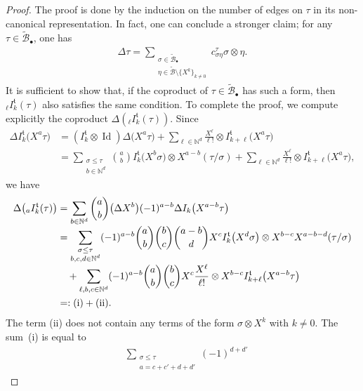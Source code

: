 \documentclass[10pt]{amsart}
\newcommand{\sbullet}{{\scriptscriptstyle\bullet}}
\theoremstyle{plain}
\theoremstyle{definition}
\DeclareMathOperator{\iden}{Id}
\newcommand{\bsmcB}{\boldsymbol{\mathcal{B}}}
\newcommand{\frkt}{\mathfrak{t}}
\newcommand{\bbN}{\mathbb{N}}
\newcommand{\mcB}{\mathcal{B}}
\begin{document}
\begin{proof}
The proof is done by the induction on the number of edges on $\tau$ in its non-canonical representation. In fact, one can conclude a stronger claim; for any $\tau\in\widetilde{\mcB}_\sbullet$, one has\vspace*{-3pt}
\begin{align}\label{eq:stronger than D}
\Delta\tau=\sum_{\substack{\sigma\in\widetilde{\mcB}_\sbullet\\ \eta\in \widetilde{\bsmcB}\setminus\{X^k\}_{k\neq0}}} c_{\sigma\eta}^\tau\sigma\otimes\eta.
\end{align}
It is sufficient to show that, if the coproduct of $\tau\in\widetilde{\mcB}_\sbullet$ has such a form, then ${}_{\ell}I_k^\frkt(\tau)$ also satisfies the same condition. To complete the proof, we compute explicitly the coproduct $\Delta( {}_{\ell}I_k^\frkt(\tau))$.
Since\vspace*{-3pt}
\begin{align*}
\Delta I_k^\frkt\bigl(X^a\tau\bigr)
&=(I_k^\frkt\otimes\iden)\Delta\bigl(X^a\tau\bigr)
+\sum_{\ell\in\bbN^d}\frac{X^{\ell}}{\ell!}\otimes I_{k+\ell}^\frkt\bigl(X^a\tau\bigr)\\
&=\sum_{\substack{\sigma\le\tau\\ b\in\bbN^d}}\binom{a}{b}
I_k^\frkt \bigl(X^b\sigma\bigr)\otimes X^{a-b}(\tau/\sigma)
+\sum_{\ell\in\bbN^d}\frac{X^{\ell}}{\ell!}\otimes I_{k+\ell}^\frkt\bigl(X^a\tau\bigr),
\end{align*}
we have\vspace*{-3pt}
\begin{align*}
\Delta\bigl({}_{a} I_k^\frkt(\tau)\bigr)
&=\sum_{b\in\bbN^d}\binom{a}{b}
\bigl(\Delta X^b\bigr)(-1)^{a-b}\Delta I_k\bigl(X^{a-b}\tau\bigr)\\[-3pt]
&=\sum_{\substack{\sigma\le\tau\\ b,c,d\in\bbN^d}}(-1)^{a-b}
\binom{a}{b}\binom{b}{c}\binom{a-b}{d}
X^c I_k^\frkt\bigl(X^d\sigma\bigr)
\otimes
X^{b-c} X^{a-b-d}(\tau/\sigma)\\[-3pt]
&\quad+\sum_{\ell,b,c\in\bbN^d}(-1)^{a-b}\binom{a}{b}\binom{b}{c}
X^c\frac{X^\ell}{\ell!}
\otimes
X^{b-c}I_{k+\ell}^\frkt\bigl(X^{a-b}\tau\bigr)\\
&=:(\textup{i})+(\textup{ii}).
\end{align*}
The term (ii) does not contain any terms of the form $\sigma\otimes X^k$ with $k\neq0$. The sum~(i) is equal to\vspace*{-3pt}
\begin{align*}
&\sum_{\substack{\sigma\le\tau \\ a=c+c'+d+d'}}(-1)^{d+d'}

\end{align*}
\end{proof}
\end{document}
